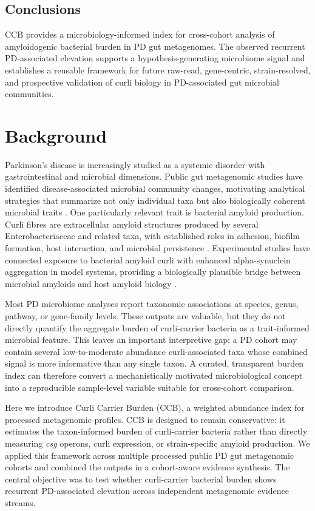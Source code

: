 \documentclass[12pt]{article}
\begin{document}
\subsection*{Conclusions}
CCB provides a microbiology-informed index for cross-cohort analysis of amyloidogenic bacterial burden in PD gut metagenomes. The observed recurrent PD-associated elevation supports a hypothesis-generating microbiome signal and establishes a reusable framework for future raw-read, gene-centric, strain-resolved, and prospective validation of curli biology in PD-associated gut microbial communities.

\section*{Background}
Parkinson's disease is increasingly studied as a systemic disorder with gastrointestinal and microbial dimensions. Public gut metagenomic studies have identified disease-associated microbial community changes, motivating analytical strategies that summarize not only individual taxa but also biologically coherent microbial traits \citep{Romano2021NPJPD,Wallen2022NatCommun}. One particularly relevant trait is bacterial amyloid production. Curli fibres are extracellular amyloid structures produced by several Enterobacteriaceae and related taxa, with established roles in adhesion, biofilm formation, host interaction, and microbial persistence \citep{Barnhart2006Curli}. Experimental studies have connected exposure to bacterial amyloid curli with enhanced alpha-synuclein aggregation in model systems, providing a biologically plausible bridge between microbial amyloids and host amyloid biology \citep{Chen2016CurliAlphaSyn}.

Most PD microbiome analyses report taxonomic associations at species, genus, pathway, or gene-family levels. These outputs are valuable, but they do not directly quantify the aggregate burden of curli-carrier bacteria as a trait-informed microbial feature. This leaves an important interpretive gap: a PD cohort may contain several low-to-moderate abundance curli-associated taxa whose combined signal is more informative than any single taxon. A curated, transparent burden index can therefore convert a mechanistically motivated microbiological concept into a reproducible sample-level variable suitable for cross-cohort comparison.

Here we introduce Curli Carrier Burden (CCB), a weighted abundance index for processed metagenomic profiles. CCB is designed to remain conservative: it estimates the taxon-informed burden of curli-carrier bacteria rather than directly measuring \textit{csg} operons, curli expression, or strain-specific amyloid production. We applied this framework across multiple processed public PD gut metagenomic cohorts and combined the outputs in a cohort-aware evidence synthesis. The central objective was to test whether curli-carrier bacterial burden shows recurrent PD-associated elevation across independent metagenomic evidence streams.
\end{document}
